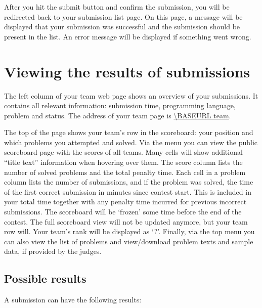 After you hit the submit button and confirm the submission, you will
be redirected back to your submission list page. On this page, a message
will be displayed that your submission was successful and the
submission should be present in the list. An error message will be
displayed if something went wrong.

\section{Viewing the results of submissions}

The left column of your team web page shows an overview of your submissions.
It contains all relevant information: submission time, programming
language, problem and status. The address of your team page is
\url{\BASEURL team}.

The top of the page shows your team's row in the scoreboard: your position and
which problems you attempted and solved. Via the menu you can view the public
scoreboard page with the scores of all teams. Many cells will show
additional ``title text'' information when hovering over them. The
score column lists the number of solved problems and the total penalty
time. Each cell in a problem column lists the number of submissions,
and if the problem was solved, the time of the first correct
submission in minutes since contest start. This is included in your
total time together with any penalty time incurred for previous
incorrect submissions. The scoreboard will
be `frozen' some time before the end of the contest. The full scoreboard view
will not be updated anymore, but your team row will. Your team's rank will
be displayed as `?'. Finally, via the top menu you can also view the
list of problems and view/download problem texts and sample data, if
provided by the judges.

\subsection{Possible results}

A submission can have the following results:

